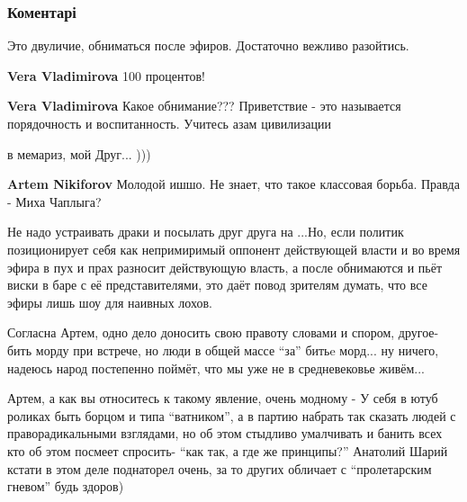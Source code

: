  
 
 
 
 
\subsubsection{Коментарі}

\begin{itemize} %
Это двуличие, обниматься после эфиров. Достаточно вежливо разойтись.

\begin{itemize} %
\textbf{Vera Vladimirova} 100 процентов!

\textbf{Vera Vladimirova} Какое обнимание??? Приветствие - это называется порядочность и воспитанность. Учитесь азам цивилизации
\end{itemize} %


в мемариз, мой Друг... )))

\textbf{Artem Nikiforov} Молодой ишшо. Не знает, что такое классовая борьба. Правда - Миха Чаплыга?


Не надо устраивать драки и посылать друг друга на ...Но, если политик
позиционирует себя как непримиримый оппонент действующей власти и во время
эфира в пух и прах разносит действующую власть, а после обнимаются и пьёт виски
в баре с её представителями, это даёт повод зрителям думать, что все эфиры лишь
шоу для наивных лохов.



Согласна Артем, одно дело доносить свою правоту словами и спором, другое- бить
морду при встрече, но люди в общей массе \enquote{за} битьe морд... ну ничего, надеюсь
народ постепенно поймёт, что мы уже не в средневековье живём...


Артем, а как вы относитесь к такому явление, очень модному - У себя в ютуб
роликах быть борцом и типа \enquote{ватником}, а в партию набрать так сказать людей с
праворадикальными взглядами, но об этом стыдливо умалчивать и банить всех кто
об этом посмеет спросить- \enquote{как так, а где же принципы?} Анатолий Шарий кстати в
этом деле поднаторел очень, за то других обличает с \enquote{пролетарским гневом} будь
здоров)


\end{itemize}

